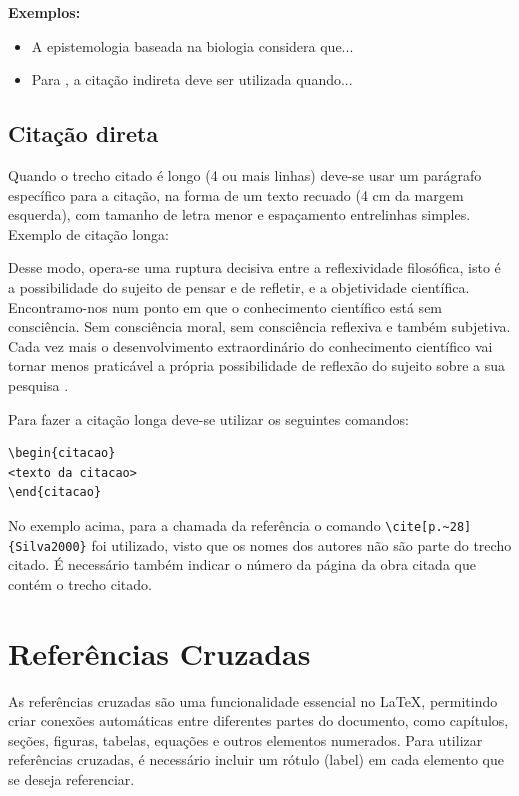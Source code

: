 \textbf{Exemplos:}
\begin{itemize}
\item A epistemologia baseada na biologia considera que... \cite{Maturana2003}
\item Para , a citação indireta deve ser utilizada quando...
\end{itemize}

\subsection{Citação direta}
\label{subsec:citacaoDireta}

Quando o trecho citado é longo (4 ou mais linhas) deve-se usar um parágrafo específico para a citação, na forma de um texto recuado (4 cm da margem esquerda), com tamanho de letra menor e espaçamento entrelinhas simples. Exemplo de citação longa:
\\
\begin{citacao}
    Desse modo, opera-se uma ruptura decisiva entre a reflexividade filosófica, isto é a possibilidade do sujeito de pensar e de refletir, e a objetividade científica. Encontramo-nos num ponto em que o conhecimento científico está sem consciência. Sem consciência moral, sem consciência reflexiva e também subjetiva. Cada vez mais o desenvolvimento extraordinário do conhecimento científico vai tornar menos praticável a própria possibilidade de reflexão do sujeito sobre a sua pesquisa \cite[p.~28]{Silva2000}.
\end{citacao}
\noindent
Para fazer a citação longa deve-se utilizar os seguintes comandos:
\begin{verbatim}
\begin{citacao}
<texto da citacao>
\end{citacao}
\end{verbatim}

No exemplo acima, para a chamada da referência o comando \verb|\cite[p.~28]{Silva2000}| foi utilizado, visto que os nomes dos autores não são parte do trecho citado. É necessário também indicar o número da página da obra citada que contém o trecho citado.


\section{Referências Cruzadas}
\label{sec:referenciasCruzadas}

As referências cruzadas são uma funcionalidade essencial no \LaTeX{}, permitindo criar conexões automáticas entre diferentes partes do documento, como capítulos, seções, figuras, tabelas, equações e outros elementos numerados. Para utilizar referências cruzadas, é necessário incluir um rótulo ({\ttfamily label}) em cada elemento que se deseja referenciar.

